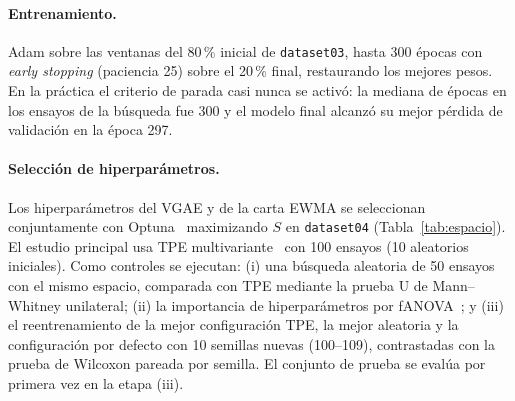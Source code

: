 \documentclass[11pt,a4paper]{article}
\begin{document}
\paragraph{Entrenamiento.} Adam sobre las ventanas del 80\,\% inicial de
\texttt{dataset03}, hasta 300 épocas con \emph{early stopping} (paciencia 25) sobre el
20\,\% final, restaurando los mejores pesos. En la práctica el criterio de parada casi
nunca se activó: la mediana de épocas en los ensayos de la búsqueda fue 300 y el
modelo final alcanzó su mejor pérdida de validación en la época 297.

\paragraph{Selección de hiperparámetros.} Los hiperparámetros del VGAE y de la carta
EWMA se seleccionan conjuntamente con Optuna~\cite{akiba2019} maximizando $S$ en
\texttt{dataset04} (Tabla~\ref{tab:espacio}). El estudio principal usa TPE
multivariante~\cite{bergstra2011} con 100 ensayos (10 aleatorios iniciales). Como
controles se ejecutan: (i) una búsqueda aleatoria de 50 ensayos con el mismo espacio,
comparada con TPE mediante la prueba U de Mann--Whitney unilateral; (ii) la importancia
de hiperparámetros por fANOVA~\cite{hutter2014}; y (iii) el reentrenamiento de la
mejor configuración TPE, la mejor aleatoria y la configuración por defecto con 10
semillas nuevas (100--109), contrastadas con la prueba de Wilcoxon pareada por semilla.
El conjunto de prueba se evalúa por primera vez en la etapa (iii).
\end{document}

